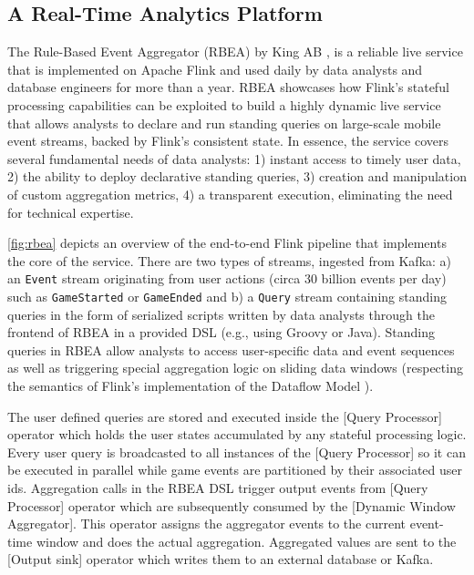 




\subsection{A Real-Time Analytics Platform}

The Rule-Based Event Aggregator (RBEA) by King AB \cite{CUSTOM:web/kingrbea}, is a reliable live service that is implemented on Apache Flink and used daily by data analysts and database engineers for more than a year. RBEA showcases how Flink's stateful processing capabilities can be exploited to build a highly dynamic live service that allows analysts to declare and run standing queries on large-scale mobile event streams, backed by Flink's consistent state. In essence, the service covers several fundamental needs of data analysts: 1) instant access to timely user data, 2) the ability to deploy declarative standing queries, 3) creation and manipulation of custom aggregation metrics, 4) a transparent execution, eliminating the need for technical expertise.

\autoref{fig:rbea} depicts an overview of the end-to-end Flink pipeline that implements the core of the service. There are two types of streams, ingested from Kafka: a) an \texttt{Event} stream originating from  user actions (circa 30 billion events per day) such as \texttt{GameStarted} or \texttt{GameEnded} and b) a \texttt{Query} stream containing standing queries in the form of serialized scripts written by data analysts through the frontend of RBEA in a provided DSL (e.g., using Groovy or Java). Standing queries in RBEA allow analysts to access user-specific data and event sequences as well as triggering special aggregation logic on sliding data windows (respecting the semantics of Flink's implementation of the Dataflow Model \cite{akidau2015dataflow}). 

The user defined queries are stored and executed inside the [Query Processor] operator which holds the user states accumulated by any stateful processing logic. Every user query is broadcasted to all instances of the [Query Processor] so it can be executed in parallel while game events are partitioned by their associated user ids. Aggregation calls in the RBEA DSL trigger output events from [Query Processor] operator which are subsequently consumed by the [Dynamic Window Aggregator]. This operator assigns the aggregator events to the current event-time window and does the actual aggregation. Aggregated values are sent to the [Output sink] operator which writes them to an external database or Kafka.


